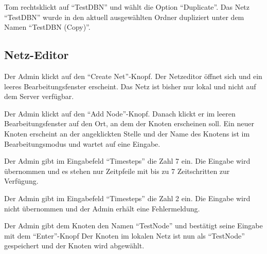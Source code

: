 \documentclass[parskip=full,11pt,twoside]{scrartcl}
\begin{document}
{Tom rechtsklickt auf \enquote{TestDBN} und wählt die Option \enquote{Duplicate}.}
{Das Netz \enquote{TestDBN} wurde in den aktuell ausgewählten Ordner dupliziert unter dem Namen \enquote{TestDBN (Copy)}.}

\subsection{Netz-Editor}


{Der Admin klickt auf den \enquote{Create Net}-Knopf.}
{Der Netzeditor öffnet sich und ein leeres Bearbeitungsfenster erscheint. Das Netz ist bisher nur lokal und nicht auf dem Server verfügbar.}

{Der Admin klickt auf den \enquote{Add Node}-Knopf. Danach klickt er im leeren Bearbeitungsfenster auf den Ort, an dem der Knoten erscheinen soll.} 
{Ein neuer Knoten erscheint an der angeklickten Stelle und der Name des Knotens ist im Bearbeitungsmodus und wartet auf eine Eingabe.}

{Der Admin gibt im Eingabefeld \enquote{Timesteps} die Zahl 7 ein.} 
{Die Eingabe wird übernommen und es stehen nur Zeitpfeile mit bis zu 7 Zeitschritten zur Verfügung.}

{Der Admin gibt im Eingabefeld \enquote{Timesteps} die Zahl 2 ein.} 
{Die Eingabe wird nicht übernommen und der Admin erhält eine Fehlermeldung.}

{Der Admin gibt dem Knoten den Namen \enquote{TestNode} und bestätigt seine Eingabe mit dem \enquote{Enter}-Knopf}
{Der Knoten im lokalen Netz ist nun als \enquote{TestNode} gespeichert und der Knoten wird abgewählt.}
\end{document}
